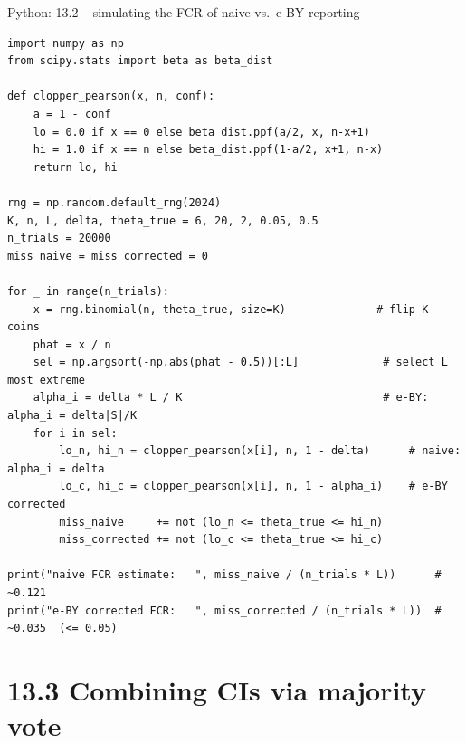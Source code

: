 \documentclass[aspectratio=169,10pt]{beamer}
\begin{document}
\begin{frame}[fragile]{Python: 13.2 -- simulating the FCR of naive vs.\ e-BY reporting}
  \begin{lstlisting}
import numpy as np
from scipy.stats import beta as beta_dist

def clopper_pearson(x, n, conf):
    a = 1 - conf
    lo = 0.0 if x == 0 else beta_dist.ppf(a/2, x, n-x+1)
    hi = 1.0 if x == n else beta_dist.ppf(1-a/2, x+1, n-x)
    return lo, hi

rng = np.random.default_rng(2024)
K, n, L, delta, theta_true = 6, 20, 2, 0.05, 0.5
n_trials = 20000
miss_naive = miss_corrected = 0

for _ in range(n_trials):
    x = rng.binomial(n, theta_true, size=K)              # flip K coins
    phat = x / n
    sel = np.argsort(-np.abs(phat - 0.5))[:L]             # select L most extreme
    alpha_i = delta * L / K                               # e-BY: alpha_i = delta|S|/K
    for i in sel:
        lo_n, hi_n = clopper_pearson(x[i], n, 1 - delta)      # naive: alpha_i = delta
        lo_c, hi_c = clopper_pearson(x[i], n, 1 - alpha_i)    # e-BY corrected
        miss_naive     += not (lo_n <= theta_true <= hi_n)
        miss_corrected += not (lo_c <= theta_true <= hi_c)

print("naive FCR estimate:   ", miss_naive / (n_trials * L))      # ~0.121
print("e-BY corrected FCR:   ", miss_corrected / (n_trials * L))  # ~0.035  (<= 0.05)
  \end{lstlisting}
\end{frame}

\section{13.3 Combining CIs via majority vote}
\end{document}

